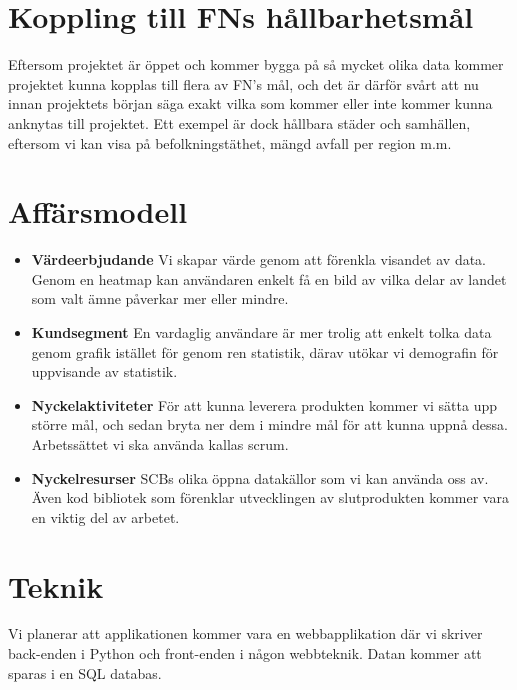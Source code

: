 \documentclass{scrartcl}
\begin{document}
\section{Koppling till FNs hållbarhetsmål}

    Eftersom projektet är öppet och kommer bygga på så mycket olika data kommer projektet kunna kopplas till flera av FN's mål, och det är därför svårt att nu innan projektets början säga exakt vilka som kommer eller inte kommer kunna anknytas till projektet. Ett exempel är dock hållbara städer och samhällen, eftersom vi kan visa på befolkningstäthet, mängd avfall per region m.m.


\section{Affärsmodell}
\begin{itemize}
    \item \textbf{Värdeerbjudande} Vi skapar värde genom att förenkla visandet av data. Genom en heatmap kan användaren enkelt få en bild av vilka delar av landet som valt ämne påverkar mer eller mindre.
    \item \textbf{Kundsegment} En vardaglig användare är mer trolig att enkelt tolka data genom grafik istället för genom ren statistik, därav utökar vi demografin för uppvisande av statistik.
    \item \textbf{Nyckelaktiviteter} För att kunna leverera produkten kommer vi sätta upp större mål, och sedan bryta ner dem i mindre mål för att kunna uppnå dessa. Arbetssättet vi ska använda kallas scrum.
    \item \textbf{Nyckelresurser} SCBs olika öppna datakällor som vi kan använda oss av. Även kod bibliotek som förenklar utvecklingen av slutprodukten kommer vara en viktig del av arbetet.
\end{itemize}

\section{Teknik}

Vi planerar att applikationen kommer vara en webbapplikation där vi skriver back-enden i Python och front-enden i någon webbteknik.
Datan kommer att sparas i en SQL databas.
\end{document}
